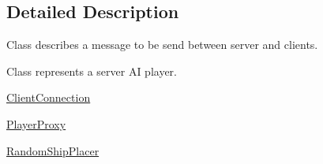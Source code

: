 \subsection{Detailed Description}
Class describes a message to be send between server and clients. 

Class represents a server A\+I player.

\hyperlink{classbattleship_1_1network_1_1ClientConnection}{Client\+Connection}

\hyperlink{classbattleship_1_1network_1_1PlayerProxy}{Player\+Proxy}

\hyperlink{classbattleship_1_1network_1_1RandomShipPlacer}{Random\+Ship\+Placer} 